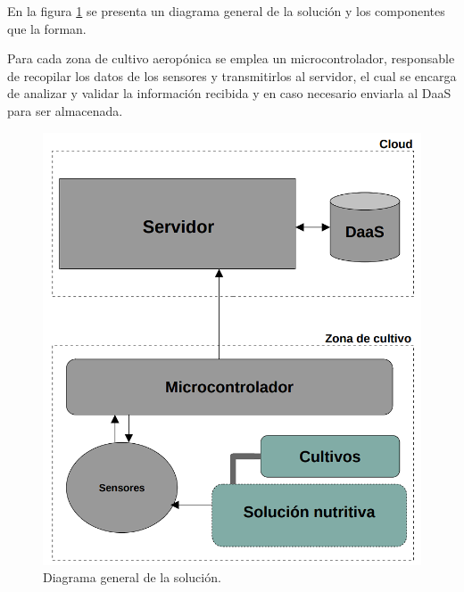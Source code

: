 En la figura \ref{fig:diagramaGeneralDeLaSolucion} se presenta un diagrama general de la solución y los componentes que la forman.

Para cada zona de cultivo aeropónica se emplea un microcontrolador, responsable de recopilar los datos de los sensores y transmitirlos al servidor, el cual se encarga de analizar y validar la información recibida y en caso necesario enviarla al DaaS para ser almacenada.

\begin{figure}[H]
	\centering
	\includegraphics[width=.8\textwidth]{./Figures/Diagrama general de la solucion v2.png}
	\caption{Diagrama general de la solución.}
	\label{fig:diagramaGeneralDeLaSolucion}
\end{figure}